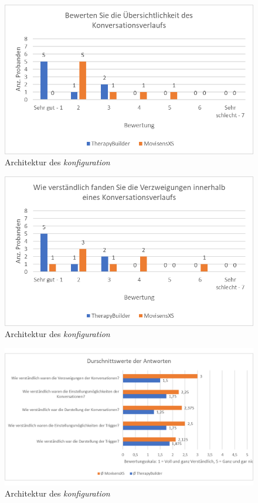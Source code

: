 \begin{figure}[h]
\centering
\includegraphics[width=1\textwidth]{pictures/diagramme/konversationverlfueber}
\caption{Architektur des \emph{konfiguration}}
\label{konversationverlfueber}
\end{figure}

\begin{figure}[h]
\centering
\includegraphics[width=1\textwidth]{pictures/diagramme/konvverzweig}
\caption{Architektur des \emph{konfiguration}}
\label{konvverzweig}
\end{figure}


\begin{figure}[h]
\centering
\includegraphics[width=1\textwidth]{pictures/diagramme/antwortendurchsch1}
\caption{Architektur des \emph{konfiguration}}
\label{antwortendurchsch1}
\end{figure}

